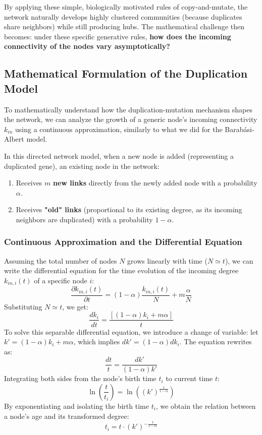 By applying these simple, biologically motivated rules of copy-and-mutate, the network naturally develops highly clustered communities (because duplicates share neighbors) while still producing hubs. The mathematical challenge then becomes: under these specific generative rules, \textbf{how does the incoming connectivity of the nodes vary asymptotically?}

\subsection{Mathematical Formulation of the Duplication Model}

To mathematically understand how the duplication-mutation mechanism shapes the network, we can analyze the growth of a generic node's incoming connectivity \( k_{in} \) using a continuous approximation, similarly to what we did for the Barabási-Albert model.

In this directed network model, when a new node is added (representing a duplicated gene), an existing node in the network:
\begin{enumerate}
    \item Receives \( m \) \textbf{new links} directly from the newly added node with a probability \( \alpha \).
    \item Receives \textbf{"old" links} (proportional to its existing degree, as its incoming neighbors are duplicated) with a probability \( 1 - \alpha \).
\end{enumerate}

\subsubsection{Continuous Approximation and the Differential Equation}
Assuming the total number of nodes \( N \) grows linearly with time (\( N \simeq t \)), we can write the differential equation for the time evolution of the incoming degree \( k_{in,i}(t) \) of a specific node \( i \):
\[
    \frac{\partial k_{in,i}(t)}{\partial t} = (1 - \alpha)\frac{k_{in,i}(t)}{N} + m\frac{\alpha}{N}
\]
Substituting \( N \simeq t \), we get:
\[
    \frac{d k_i}{dt} = \frac{[(1 - \alpha)k_i + m\alpha]}{t}
\]
To solve this separable differential equation, we introduce a change of variable: let \( k' = (1 - \alpha)k_i + m\alpha \), which implies \( dk' = (1 - \alpha)dk_i \). The equation rewrites as:
\[
    \frac{dt}{t} = \frac{dk'}{(1 - \alpha)k'}
\]
Integrating both sides from the node's birth time \( t_i \) to current time \( t \):
\[
    \ln\left(\frac{t}{t_i}\right) = \ln\left( (k')^{\frac{1}{1 - \alpha}} \right)
\]
By exponentiating and isolating the birth time \( t_i \), we obtain the relation between a node's age and its transformed degree:
\[
    t_i = t \cdot (k')^{-\frac{1}{1 - \alpha}}
\]

